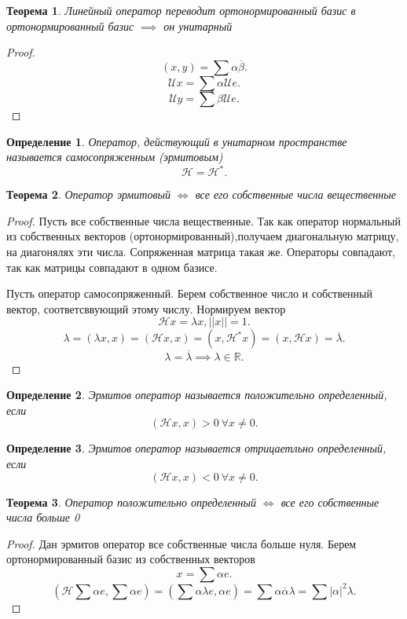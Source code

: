 \documentclass{scrartcl}
\newtheorem{theorem}{Теорема}
\newtheorem{definition}{Определение}
\begin{document}
\begin{theorem}
    Линейный оператор переводит ортонормированный базис в ортонормированный базис $\implies$ он унитарный
\end{theorem}
\begin{proof}
    \[
        (x,y) = \sum \alpha \overline{\beta}
    .\] 
    \[
        \mathcal{U} x = \sum \alpha \mathcal{U}e
    .\] 
    \[
        \mathcal{U} y = \sum \beta \mathcal{U} e
    .\] 
\end{proof}
\begin{definition}
    Оператор, действующий в унитарном пространстве называется самосопряженным (эрмитовым)
    \[
        \mathcal{H} = \mathcal{H}^{*}
    .\] 
\end{definition}
\begin{theorem}
    Оператор эрмитовый $\iff$ все его собственные числа вещественные
\end{theorem}
\begin{proof}
    Пусть все собственные числа вещественные. Так как оператор нормальный из собственных векторов (ортонормированный),получаем диагональную матрицу, на диагонялях эти числа.
    Сопряженная матрица такая же. Операторы совпадают, так как матрицы совпадают в одном базисе.
    
    Пусть оператор самосопряженный. Берем собственное число и собственный вектор, соответсввующий этому числу.  Нормируем вектор
    \[
        \mathcal{H} x = \lambda x , ||x|| = 1
    .\] 
    \[
        \lambda = (\lambda x, x) = (\mathcal{H} x, x) = (x, \mathcal{H}^{*} x) =
        (x, \mathcal{H} x) = \overline{\lambda}
    .\] 
    \[
    \lambda = \overline{\lambda} \implies \lambda \in \mathbb{R}
    .\] 
\end{proof}
\begin{definition}
    Эрмитов оператор называется положительно определенный, если
    \[
        (\mathcal{H} x, x) > 0  ~\forall  x \neq 0
    .\] 
\end{definition}
\begin{definition}
    
    Эрмитов оператор называется отрицаетльно определенный, если
    \[
        (\mathcal{H} x, x) < 0  ~\forall  x \neq 0
    .\] 
\end{definition}
\begin{theorem}
    Оператор положительно определенный $\iff$ все его собственные числа больше 0
\end{theorem}
\begin{proof}
    Дан эрмитов оператор все собственные числа больше нуля. Берем ортонормированный базис из собственных векторов
    \[
        x = \sum \alpha e
    .\] 
    \[
        ( \mathcal{H} \sum \alpha e, \sum \alpha e ) = (\sum \alpha \lambda e, \alpha e) = \sum \alpha \overline{\alpha} \lambda = \sum |\alpha|^2 \lambda
    .\] 
\end{proof}
\end{document}
